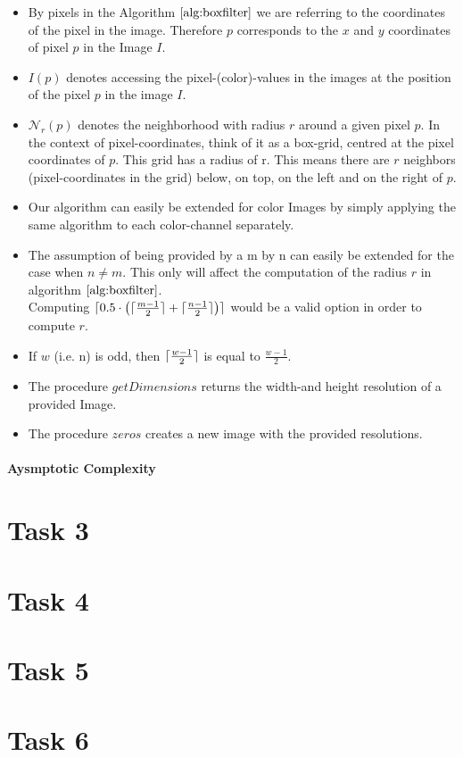 \documentclass{paper}
\DeclarePairedDelimiter\ceil{\lceil}{\rceil}
\begin{document}
\begin{itemize}
    \item By pixels in the Algorithm $\ref{alg:boxfilter}$ we are referring to the coordinates of the pixel in the image. Therefore $p$ corresponds to the $x$ and $y$ coordinates of pixel $p$ in the Image $I$.
    \item $I(p)$ denotes accessing the pixel-(color)-values in the images at the position of the pixel $p$ in the image $I$.
    \item $\mathcal{N}_r(p)$ denotes the neighborhood with radius $r$ around a given pixel $p$. In the context of pixel-coordinates, think of it as a box-grid, centred at the pixel coordinates of $p$. This grid has a radius of r. This means there are $r$ neighbors (pixel-coordinates in the grid) below, on top, on the left and on the right of $p$.
    \item Our algorithm can easily be extended for color Images by simply applying the same algorithm to each color-channel separately.
    \item The assumption of being provided by a m by n can easily be extended for the case when $n \neq m$. This only will affect the computation of the radius $r$ in algorithm $\ref{alg:boxfilter}$. \\ Computing $\ceil{0.5 \cdot \left( \ceil{\frac{m-1}{2}} + \ceil{\frac{n-1}{2}}\right)}$ would be a valid option in order to compute $r$. 
    \item If $w$ (i.e. n) is odd, then $\ceil{\frac{w-1}{2}}$ is equal to $\frac{w-1}{2}$. 
    \item The procedure $getDimensions$ returns the width-and height resolution of a provided Image.
    \item The procedure $zeros$ creates a new image with the provided resolutions.
\end{itemize}


\paragraph{Aysmptotic Complexity}


\section*{Task 3}
\section*{Task 4}
\section*{Task 5}




\section*{Task 6}
\end{document}
